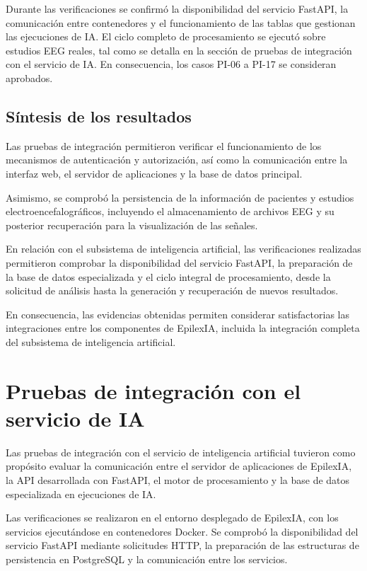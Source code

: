 Durante las verificaciones se confirmó la disponibilidad del servicio FastAPI, la comunicación entre contenedores y el funcionamiento de las tablas que gestionan las ejecuciones de IA.
El ciclo completo de procesamiento se ejecutó sobre estudios EEG reales, tal como se detalla en la sección de pruebas de integración con el servicio de IA.
En consecuencia, los casos PI-06 a PI-17 se consideran aprobados.


\subsection{Síntesis de los resultados}


Las pruebas de integración permitieron verificar el funcionamiento de los mecanismos de autenticación y autorización, así como la comunicación entre la interfaz web, el servidor de aplicaciones y la base de datos principal.

Asimismo, se comprobó la persistencia de la información de pacientes y estudios electroencefalográficos, incluyendo el almacenamiento de archivos EEG y su posterior recuperación para la visualización de las señales.

En relación con el subsistema de inteligencia artificial, las verificaciones realizadas permitieron comprobar la disponibilidad del servicio FastAPI, la preparación de la base de datos especializada y el ciclo integral de procesamiento, desde la solicitud de análisis hasta la generación y recuperación de nuevos resultados.

En consecuencia, las evidencias obtenidas permiten considerar satisfactorias las integraciones entre los componentes de EpilexIA, incluida la integración completa del subsistema de inteligencia artificial.


\section{Pruebas de integración con el servicio de IA}

Las pruebas de integración con el servicio de
inteligencia artificial tuvieron como propósito
evaluar la comunicación entre el servidor de
aplicaciones de EpilexIA, la API desarrollada
con FastAPI, el motor de procesamiento y la
base de datos especializada en ejecuciones de IA.

Las verificaciones se realizaron en el entorno desplegado de EpilexIA, con los servicios ejecutándose en contenedores Docker.
Se comprobó la disponibilidad del servicio FastAPI mediante solicitudes HTTP, la preparación de las estructuras de persistencia en PostgreSQL y la comunicación entre los servicios.

